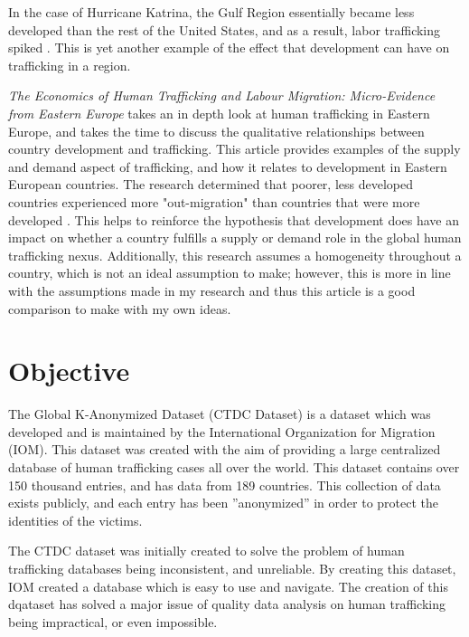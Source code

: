 \documentclass{article} %
\begin{document}
In the case of Hurricane Katrina, the Gulf Region essentially became less developed than the rest of the United States, and as a result, labor trafficking spiked \parencite{Climate}. This is yet another example of the effect that development can have on trafficking in a region.


\emph{The Economics of Human Trafficking and Labour Migration: Micro-Evidence from Eastern Europe}\parencite{EastEurope} takes an in depth look at human trafficking in Eastern Europe, and takes the time to discuss the qualitative relationships between country development and trafficking. This article provides examples of the supply and demand aspect of trafficking, and how it relates to development in Eastern European countries. The research determined that poorer, less developed countries experienced more "out-migration" than countries that were more developed \parencite{EastEurope}. This helps to reinforce the hypothesis that development does have an impact on whether a country fulfills a supply or demand role in the global human trafficking nexus. Additionally, this research assumes a homogeneity throughout a country, which is not an ideal assumption to make; however, this is more in line with the assumptions made in my research and thus this article is a good comparison to make with my own ideas.


\section{Objective}

The Global K-Anonymized Dataset (CTDC Dataset) is a dataset which was developed and is maintained by the International Organization for Migration (IOM). This dataset was created with the aim of providing a large centralized database of human trafficking cases all over the world. This dataset contains over 150 thousand entries, and has data from 189 countries. This collection of data exists publicly, and each entry has been ''anonymized'' in order to protect the identities of the victims.

The CTDC dataset was initially created to solve the problem of human trafficking databases being inconsistent, and unreliable. By creating this dataset, IOM created a database which is easy to use and navigate. The creation of this dqataset has solved a major issue of quality data analysis on human trafficking being impractical, or even impossible.
\end{document}
